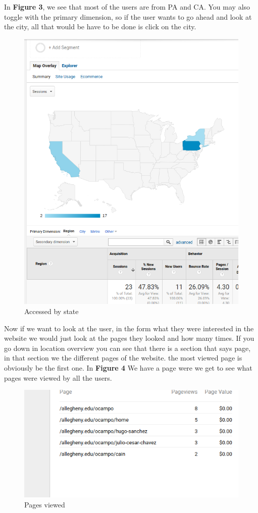 \documentclass{article}
\begin{document}
In \textbf{Figure 3}, we see that most of the users are from PA and CA. You may also toggle with the primary dimension, so if the user wants to go ahead and look at the city, all that would be have to be done is click on the city. 
\begin{figure}[ht!]
\includegraphics[scale = .5]{city.png}
\centering
\caption{Accessed by state }
\end{figure}
Now if we want to look at the user, in the form what they were interested in the website we would just look at the pages they looked and how many times. If you go down in location overview you can see that there is a section that says page, in that section we the different pages of the website. 
the most viewed page is obviously be the first one. In \textbf{Figure 4 } We have a page were we get to see what pages were viewed by all the users. 
 
\begin{figure}[t!]
\includegraphics[scale = .5]{pages.png}
\centering
\caption{Pages viewed}
\end{figure}
\end{document}
